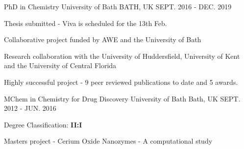 \begin{cventries}
  \cventry
    {PhD in Chemistry}
    {University of Bath}
    {BATH, UK}
    {SEPT. 2016 - DEC. 2019}
    {
      \begin{cvitems}
        \item {Thesis submitted - Viva is scheduled for the 13th Feb.}
        \item {Collaborative project funded by AWE and the University of Bath}
        \item {Research collaboration with the University of Huddersfield, University of Kent and the University of Central Florida}
        \item {Highly successful project - 9 peer reviewed publications to date and 5 awards.}
      \end{cvitems}
    }
  \cventry
    {MChem in Chemistry for Drug Discovery}
    {University of Bath}
    {Bath, UK}
    {SEPT. 2012 - JUN. 2016}
    {
      \begin{cvitems}
        \item {Degree Classification: \textbf{II:I}}
        \item {Masters project - Cerium Oxide Nanozymes - A computational study}      
      \end{cvitems}
    }
\end{cventries}


